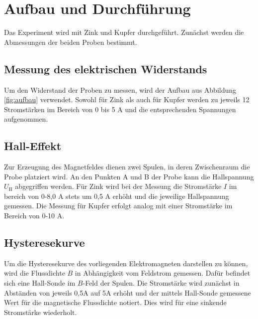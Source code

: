 \section {Aufbau und Durchführung}
\label{sec:durchführung}
Das Experiment wird mit Zink und Kupfer durchgeführt. Zunächst werden die Abmessungen der beiden Proben bestimmt.
\subsection{Messung des elektrischen Widerstands}
Um den Widerstand der Proben zu messen, wird der Aufbau aus Abbildung \ref{fig:aufbau} verwendet.
Sowohl für Zink als auch für Kupfer werden zu jeweils 12 Stromstärken im Bereich von 0 bis 5 \si{\ampere} und die entsprechenden Spannungen aufgenommen.
\subsection{Hall-Effekt}
Zur Erzeugung des Magnetfeldes dienen zwei Spulen, in deren Zwischenraum die Probe platziert wird. An den Punkten A und B der Probe kann die Hallspannung $U_\mathrm{H}$ abgegriffen werden.
Für Zink wird bei der Messung die Stromstärke $I$ im bereich von 0-8,0 \si{\ampere} stets um 0,5 \si{\ampere} erhöht und die jeweilige Hallspannung gemessen. Die Messung für Kupfer erfolgt analog mit einer Stromstärke im Bereich von 0-10 \si{\ampere}.
\subsection{Hysteresekurve}
Um die Hysteresekurve des vorliegenden Elektromagneten darstellen zu können, wird die Flussdichte $B$ in Abhängigkeit vom Feldstrom gemessen. Dafür befindet sich eine Hall-Sonde im $B$-Feld der Spulen. Die Stromstärke wird zunächst in Abständen von jeweils 0,5\si{\ampere} auf 5\si{\ampere} erhöht und der mittels Hall-Sonde gemessene Wert für die magnetische Flussdichte notiert. Dies wird für eine sinkende Stromstärke wiederholt.
